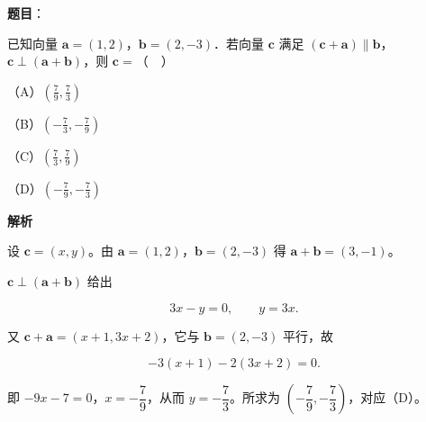 \begin{answer}

\textbf{题目}：

已知向量 $\boldsymbol a=(1,2)$，$\boldsymbol b=(2,-3)$．若向量 $\boldsymbol c$ 满足 $(\boldsymbol c+\boldsymbol a)\parallel\boldsymbol b$，$\boldsymbol c\perp(\boldsymbol a+\boldsymbol b)$，则 $\boldsymbol c=$（　）

（A）$\left(\frac79,\frac73\right)$

（B）$\left(-\frac73,-\frac79\right)$

（C）$\left(\frac73,\frac79\right)$

（D）$\left(-\frac79,-\frac73\right)$

\textbf{解析}

设 $\boldsymbol c=(x,y)$。由 $\boldsymbol a=(1,2)$，$\boldsymbol b=(2,-3)$ 得 $\boldsymbol a+\boldsymbol b=(3,-1)$。

$\boldsymbol c\perp(\boldsymbol a+\boldsymbol b)$ 给出

\nopagebreak[4]
\[3x-y=0,\qquad y=3x.\]

又 $\boldsymbol c+\boldsymbol a=(x+1,3x+2)$，它与 $\boldsymbol b=(2,-3)$ 平行，故

\nopagebreak[4]
\[-3(x+1)-2(3x+2)=0.\]

即 $-9x-7=0$，$x=-\dfrac79$，从而 $y=-\dfrac73$。所求为 $\left(-\dfrac79,-\dfrac73\right)$，对应（D）。


\end{answer}
